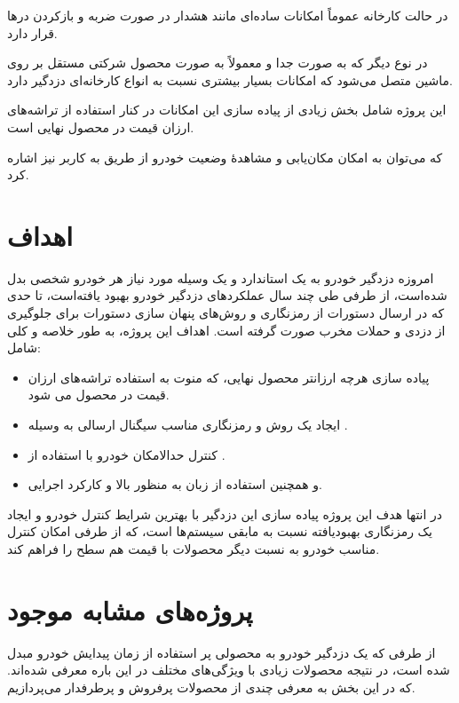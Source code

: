\documentclass[a4paper,12pt]{report}
\begin{document}
	در حالت کارخانه عموماً امکانات ساده‌ای مانند هشدار در صورت ضربه و بازکردن درها قرار دارد.

	در نوع دیگر که به صورت جدا و معمولاً به صورت محصول شرکتی مستقل بر روی ماشین متصل می‌شود که امکانات بسیار بیشتری نسبت به انواع کارخانه‌ای دزدگیر دارد.

	این پروژه شامل بخش زیادی از پیاده سازی این امکانات در کنار استفاده از تراشه‌های ارزان قیمت در محصول نهایی است.

	که می‌توان به امکان مکان‌یابی و مشاهدهٔ وضعیت خودرو از طریق
	به کاربر نیز اشاره کرد.


	\section{
	اهداف
	}\label{sec2:chap1}
	امروزه دزدگیر خودرو به یک استاندارد و یک وسیله مورد نیاز هر خودرو شخصی بدل شده‌است،
	از طرفی طی چند سال عملکرد‌های دزدگیر خودرو بهبود یافته‌است،‌ تا حدی که در ارسال دستورات
	از رمزنگاری و روش‌های پنهان سازی دستورات برای جلوگیری از دزدی و حملات مخرب صورت گرفته است.
	اهداف این پروژه، به طور خلاصه و کلی شامل:
	\begin{itemize}[nosep]
		\item
		پیاده سازی هرچه ارزانتر محصول نهایی، که منوت به استفاده تراشه‌های ارزان قیمت در محصول می شود.
		\item
		ایجاد یک روش و رمزنگاری مناسب سیگنال ارسالی به وسیله
		.
		\item
		کنترل حدالامکان خودرو با استفاده از
		.
		\item
		و همچنین استفاده از زبان
		به منظور
		بالا و کارکرد اجرایی.
	\end{itemize}

		در انتها هدف این پروژه پیاده سازی این دزدگیر با بهترین شرایط کنترل خودرو و ایجاد یک رمزنگاری بهبودیافته نسبت به مابقی سیستم‌ها است، که از طرفی امکان کنترل مناسب خودرو به نسبت دیگر محصولات با قیمت هم سطح را فراهم کند.
	\section{
	پروژه‌های مشابه موجود
	}\label{sec3:chap1}
	از طرفی که یک دزدگیر خودرو به محصولی پر استفاده از زمان پیدایش خودرو مبدل شده است، در نتیجه محصولات زیادی با ويژگی‌های مختلف در این باره معرفی شده‌اند. که در این بخش به معرفی چندی از محصولات پرفروش و پرطرفدار می‌پردازیم.
\end{document}
